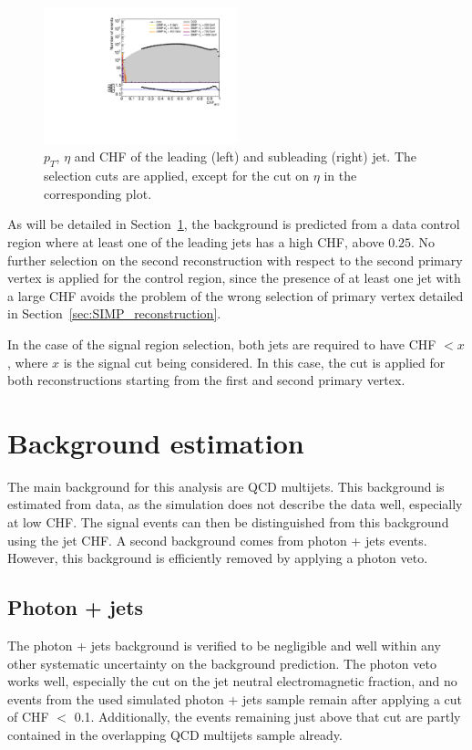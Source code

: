 \begin{figure}[ht]
  \includegraphics[width=0.5\textwidth]{figures/jet2_chf_newtrigger}
  \caption{$p_T$, $\eta$ and CHF of the leading (left) and subleading (right) jet. The selection cuts are applied, except for the cut on $\eta$ in the corresponding plot.}
  \label{fig:event_selection}
\end{figure}

As will be detailed in Section~\ref{sec:SIMP_backgrounds}, the background is predicted from a data control region where at least one of the leading jets has a high CHF, above $0.25$. No further selection on the second reconstruction with respect to the second primary vertex is applied for the control region, since the presence of at least one jet with a large CHF avoids the problem of the wrong selection of primary vertex detailed in Section~\ref{sec:SIMP_reconstruction}.

In the case of the signal region selection, both jets are required to have CHF $< x$, where $x$ is the signal cut being considered. In this case, the cut is applied for both reconstructions starting from the first and second primary vertex.

\section{Background estimation}
\label{sec:SIMP_backgrounds}

The main background for this analysis are \acs{QCD} multijets. This background is estimated from data, as the simulation does not describe the data well, especially at low CHF. The signal events can then be distinguished from this background using the jet CHF. A second background comes from photon + jets events. However, this background is efficiently removed by applying a photon veto.

\subsection{Photon + jets}

The photon + jets background is verified to be negligible and well within any other systematic uncertainty on the background prediction. The photon veto works well, especially the cut on the jet neutral electromagnetic fraction, and no events from the used simulated photon + jets sample remain after applying a cut of CHF $<$ 0.1. Additionally, the events remaining just above that cut are partly contained in the overlapping \acs{QCD} multijets sample already.


